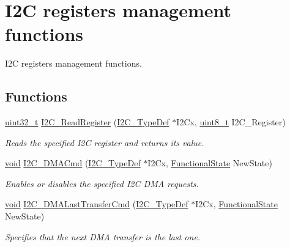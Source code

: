 \hypertarget{group___i2_c___group4}{\section{I2\-C registers management functions}
\label{group___i2_c___group4}
}


I2\-C registers management functions.  


\subsection*{Functions}
\begin{DoxyCompactItemize}
\item 
\hyperlink{stdint_8h_a435d1572bf3f880d55459d9805097f62}{uint32\-\_\-t} \hyperlink{group___i2_c___group4_ga1b2392356f4ff2a4bfeb6cd13778e16b}{I2\-C\-\_\-\-Read\-Register} (\hyperlink{struct_i2_c___type_def}{I2\-C\-\_\-\-Type\-Def} $\ast$I2\-Cx, \hyperlink{stdint_8h_aba7bc1797add20fe3efdf37ced1182c5}{uint8\-\_\-t} I2\-C\-\_\-\-Register)
\begin{DoxyCompactList}\small\item\em Reads the specified I2\-C register and returns its value. \end{DoxyCompactList}\item 
\hyperlink{group___n_a_m_e_ga18028b8badbf1ea7e704ccac3c488e82}{void} \hyperlink{group___i2_c___group4_ga38502ce11e5ec923e0f6476aaa35b45c}{I2\-C\-\_\-\-D\-M\-A\-Cmd} (\hyperlink{struct_i2_c___type_def}{I2\-C\-\_\-\-Type\-Def} $\ast$I2\-Cx, \hyperlink{group___exported__types_gac9a7e9a35d2513ec15c3b537aaa4fba1}{Functional\-State} New\-State)
\begin{DoxyCompactList}\small\item\em Enables or disables the specified I2\-C D\-M\-A requests. \end{DoxyCompactList}\item 
\hyperlink{group___n_a_m_e_ga18028b8badbf1ea7e704ccac3c488e82}{void} \hyperlink{group___i2_c___group4_gab2e994c5681eb6ec7c26a03ffe1de060}{I2\-C\-\_\-\-D\-M\-A\-Last\-Transfer\-Cmd} (\hyperlink{struct_i2_c___type_def}{I2\-C\-\_\-\-Type\-Def} $\ast$I2\-Cx, \hyperlink{group___exported__types_gac9a7e9a35d2513ec15c3b537aaa4fba1}{Functional\-State} New\-State)
\begin{DoxyCompactList}\small\item\em Specifies that the next D\-M\-A transfer is the last one. \end{DoxyCompactList}\end{DoxyCompactItemize}


